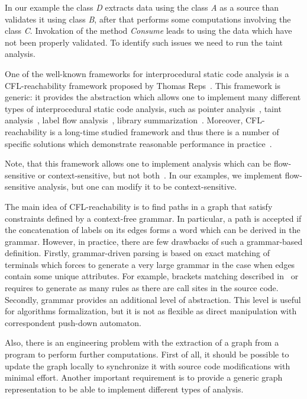 In our example the class \textit{D} extracts data using the class \textit{A} as a source than validates it using class \textit{B}, after that performs some computations involving the class \textit{C}.
Invokation of the method \textit{Consume} leads to using the data which have not been properly validated.
To identify such issues we need to run the taint analysis.

One of the well-known frameworks for interprocedural static code analysis is a CFL-reachability framework proposed by Thomas Reps~\cite{Reps}.
This framework is generic: it provides the abstraction which allows one to implement many different types of interprocedural static code analysis, such as pointer analysis~\cite{Zheng, JavaCFL}, taint analysis~\cite{Huang:2015:SPT:2771783.2771803}, label flow analysis~\cite{10.1007/11823230_7,CFLr}, library summarization~\cite{10.1007/978-3-662-54434-1_33}.
Moreover, CFL-reachability is a long-time studied framework and thus there is a number of specific solutions which demonstrate reasonable performance in practice~\cite{Wang:2017:GSD:3093315.3037744}.

Note, that this framework allows one to implement analysis which can be flow-sensitive or context-sensitive, but not both~\cite{Reps:2000:UCD:345099.345137}. In our examples, we implement flow-sensitive analysis, but one can modify it to be context-sensitive.

The main idea of CFL-reachability is to find paths in a graph that satisfy constraints defined by a context-free grammar.
In particular, a path is accepted if the concatenation of labels on its edges forms a word which can be derived in the grammar.
However, in practice, there are few drawbacks of such a grammar-based definition.
Firstly, grammar-driven parsing is based on exact matching of terminals which forces to generate a very large grammar in the case when edges contain some unique attributes.
For example, brackets matching described in~\cite{CFLr} or~\cite{Zheng, JavaCFL} requires to generate as many rules as there are call sites in the source code.
Secondly, grammar provides an additional level of abstraction.
This level is useful for algorithms formalization, but it is not as flexible as direct manipulation with correspondent push-down automaton.

Also, there is an engineering problem with the extraction of a graph from a program to perform further computations.
First of all, it should be possible to update the graph locally to synchronize it with source code modifications with minimal effort.
Another important requirement is to provide a generic graph representation to be able to implement different types of analysis.

